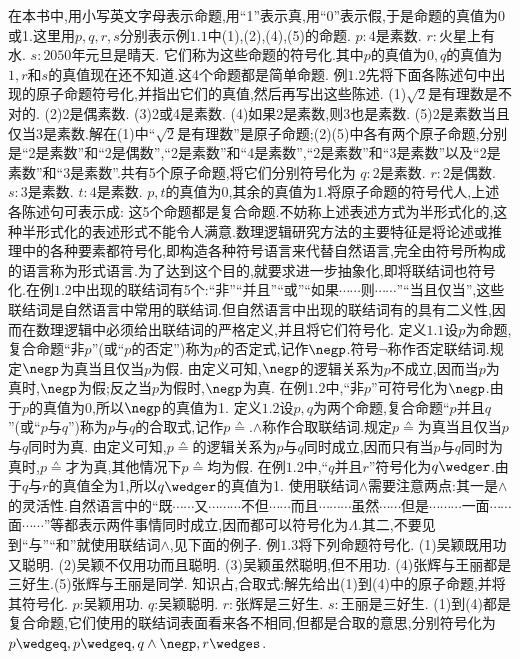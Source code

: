 {在本书中,用小写英文字母表示命题,用“1”表示真,用“0”表示假,于是命题的真值为0或1.这里用$p,q,r,s$分别表示例$1.1$中(1),(2),(4),(5)的命题.
$p:4$是素数.
$r:$火星上有水.
$s:2050$年元旦是晴天.
它们称为这些命题的符号化.其中$p$的真值为$0,q$的真值为$1,r$和$s$的真值现在还不知道.这4个命题都是简单命题.
例$1.2$先将下面各陈述句中出现的原子命题符号化,并指出它们的真值,然后再写出这些陈述.
(1)$\sqrt{2}$是有理数是不对的.
(2)2是偶素数.
(3)2或4是素数.
(4)如果2是素数,则3也是素数.
(5)2是素数当且仅当3是素数.解在(1)中“$\sqrt{2}$是有理数”是原子命题;(2)(5)中各有两个原子命题,分别是“2是素数”和“2是偶数”,“2是素数”和“4是素数”,“2是素数”和“3是素数”以及“2是素数”和“3是素数”.共有5个原子命题,将它们分别符号化为
$q:2$是素数.
$r:2$是偶数.
$s:3$是素数.
$t:4$是素数.
$p,t$的真值为0,其余的真值为1.将原子命题的符号代人,上述各陈述句可表示成:
这5个命题都是复合命题.不妨称上述表述方式为半形式化的,这种半形式化的表述形式不能令人满意.数理逻辑研究方法的主要特征是将论述或推理中的各种要素都符号化,即构造各种符号语言来代替自然语言,完全由符号所构成的语言称为形式语言.为了达到这个目的,就要求进一步抽象化,即将联结词也符号
化.在例$1.2$中出现的联结词有5个:“非”“并且”“或”“如果$\cdots\cdots$则$\cdots\cdots$”“当且仅当”,这些联结词是自然语言中常用的联结词.但自然语言中出现的联结词有的具有二义性,因而在数理逻辑中必须给出联结词的严格定义,并且将它们符号化.
定义$1.1$设$p$为命题,复合命题“非$p$”(或“$p$的否定”)称为$p$的否定式,记作$\negp$.符号$\neg$称作否定联结词.规定$\negp$为真当且仅当$p$为假.
由定义可知,$\negp$的逻辑关系为$p$不成立,因而当$p$为真时,$\negp$为假;反之当$p$为假时,$\negp$为真.
在例$1.2$中,“非$p$”可符号化为$\negp$.由于$p$的真值为0,所以$\negp$的真值为1.
定义$1.2$设$p,q$为两个命题,复合命题“$p$并且$q$”(或“$p$与$q$”)称为$p$与$q$的合取式,记作$p\wedgeq$.$\wedge$称作合取联结词.规定$p\wedgeq$为真当且仅当$p$与$q$同时为真.
由定义可知,$p\wedgeq$的逻辑关系为$p$与$q$同时成立,因而只有当$p$与$q$同时为真时,$p\wedgeq$才为真,其他情况下$p\wedgeq$均为假.
在例$1.2$中,“$q$并且$r$”符号化为$q\wedger$.由于$q$与$r$的真值全为1,所以$q\wedger$的真值为1.
使用联结词$\wedge$需要注意两点:其一是$\wedge$的灵活性.自然语言中的“既$\cdots\cdots$又$\cdots\cdots\cdots$不但$\cdots\cdots$而且$\cdots\cdots\cdots$虽然$\cdots\cdots$但是$\cdots\cdots\cdots$一面$\cdots\cdots$面$\cdots\cdots$”等都表示两件事情同时成立,因而都可以符号化为$\Lambda$.其二,不要见到“与”“和”就使用联结词$\wedge$,见下面的例子.
例$1.3$将下列命题符号化.
(1)吴颖既用功又聪明.
(2)吴颖不仅用功而且聪明.
(3)吴颖虽然聪明,但不用功.
(4)张辉与王丽都是三好生.(5)张辉与王丽是同学.
知识占,合取式:解先给出(1)到(4)中的原子命题,并将其符号化.
$p$:吴颖用功.
$q$:吴颖聪明.
$r:$张辉是三好生.
$s:$王丽是三好生.
(1)到(4)都是复合命题,它们使用的联结词表面看来各不相同,但都是合取的意思,分别符号化为$p\wedgeq,p\wedgeq,q\wedge\negp,r\wedges$.
}
